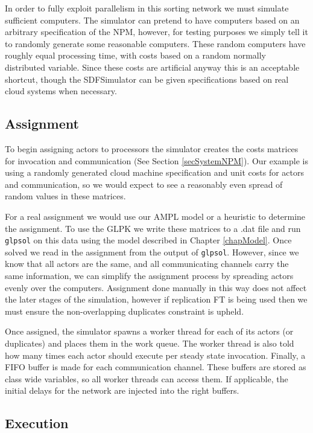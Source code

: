 In order to fully exploit parallelism in this sorting network we must simulate sufficient computers.
The simulator can pretend to have computers based on an arbitrary specification of the NPM, however, for testing purposes we simply tell it to randomly generate some reasonable computers.
These random computers have roughly equal processing time, with costs based on a random normally distributed variable.
Since these costs are artificial anyway this is an acceptable shortcut, though the SDFSimulator can be given specifications based on real cloud systems when necessary.

\subsection{Assignment}

To begin assigning actors to processors the simulator creates the costs matrices for invocation and communication (See Section \ref{secSystemNPM}).
Our example is using a randomly generated cloud machine specification and unit costs for actors and communication, so we would expect to see a reasonably even spread of random values in these matrices.

For a real assignment we would use our AMPL model or a heuristic to determine the assignment.
To use the GLPK we write these matrices to a .dat file and run \verb=glpsol= on this data using the model described in Chapter \ref{chapModel}.
Once solved we read in the assignment from the output of \verb=glpsol=.
However, since we know that all actors are the same, and all communicating channels carry the same information, we can simplify the assignment process by spreading actors evenly over the computers.
Assignment done manually in this way does not affect the later stages of the simulation, however if replication FT is being used then we must ensure the non-overlapping duplicates constraint is upheld.

Once assigned, the simulator spawns a worker thread for each of its actors (or duplicates) and places them in the work queue.
The worker thread is also told how many times each actor should execute per steady state invocation.
Finally, a FIFO buffer is made for each communication channel.
These buffers are stored as class wide variables, so all worker threads can access them.
If applicable, the initial delays for the network are injected into the right buffers.

\subsection{Execution}

